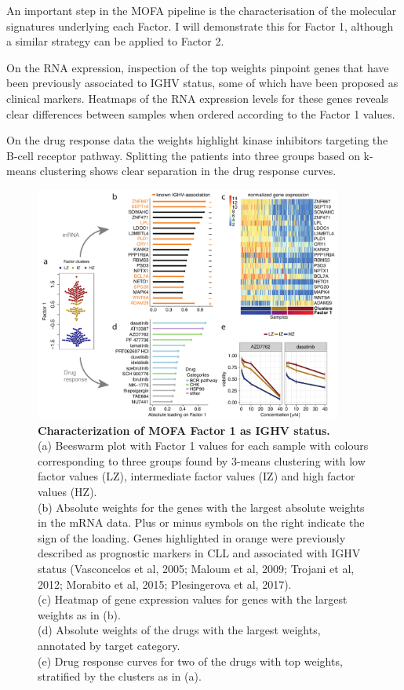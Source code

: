 An important step in the MOFA pipeline is the characterisation of the molecular signatures underlying each Factor. I will demonstrate this for Factor 1, although a similar strategy can be applied to Factor 2.

On the RNA expression, inspection of the top weights pinpoint genes that have been previously associated to IGHV status, some of which have been proposed as clinical markers\cite{Vasconcelos2005,Morabito2015}. Heatmaps of the RNA expression levels for these genes reveals clear differences between samples when ordered according to the Factor 1 values.

On the drug response data the weights highlight kinase inhibitors targeting the B-cell receptor pathway. Splitting the patients into three groups based on k-means clustering shows clear separation in the drug response curves.

\begin{figure}[H]
	\centering 	
	\includegraphics[width=0.90\textwidth]{MOFA_CLL_Factor1}
	\caption{
	\textbf{Characterization of MOFA Factor 1 as IGHV status.}\\
	(a) Beeswarm plot with Factor 1 values for each sample with colours corresponding to three groups found by 3-means clustering with low factor values (LZ), intermediate factor values (IZ) and high factor values (HZ).\\
	(b) Absolute weights for the genes with the largest absolute weights in the mRNA data. Plus or minus symbols on the right indicate the sign of the loading. Genes highlighted in orange were previously described as prognostic markers in CLL and associated with IGHV status (Vasconcelos et al, 2005; Maloum et al, 2009; Trojani et al, 2012; Morabito et al, 2015; Plesingerova et al, 2017).\\
	(c) Heatmap of gene expression values for genes with the largest weights as in (b).\\
	(d) Absolute weights of the drugs with the largest weights, annotated by target category.\\
	(e) Drug response curves for two of the drugs with top weights, stratified by the clusters as in (a).
	}
	\label{fig:MOFA_CLL_Factor1}
\end{figure}

